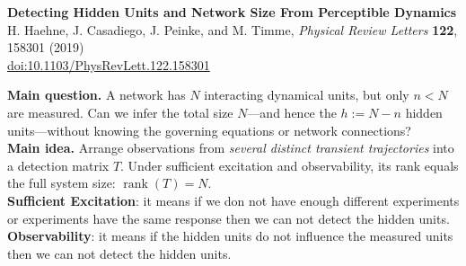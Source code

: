\documentclass[10pt,a4paper]{article}
\begin{document}
\begin{center}
{\Large\bfseries\color{navy} Detecting Hidden Units and Network Size From Perceptible Dynamics}\\[2pt]
{\small H. Haehne, J. Casadiego, J. Peinke, and M. Timme,\quad
\emph{Physical Review Letters} \textbf{122}, 158301 (2019)}\\[-1pt]
{\small \href{https://doi.org/10.1103/PhysRevLett.122.158301}{doi:10.1103/PhysRevLett.122.158301}}
\end{center}
\vspace{-3pt}
\noindent\colorbox{navy!6}{\parbox{\dimexpr\linewidth-2\fboxsep\relax}{\textbf{Main question.}
A network has $N$ interacting dynamical units, but only $n<N$ are measured. Can we infer the total size $N$---and hence the $h:=N-n$ hidden units---without knowing the governing equations or network connections?\\[2pt]
\textbf{Main idea.} Arrange observations from \emph{several distinct transient trajectories} into a detection matrix $T$. Under sufficient excitation and observability, its rank equals the full system size: $\boxed{\operatorname{rank}(T)=N}$.
\\
\textbf{Sufficient Excitation}: it means if we don not have enough different experiments or experiments have the same response then we can not detect the hidden units.
\\
\textbf{Observability}: it means if the hidden units do not influence the measured units then we can not detect the hidden units.
}}
\end{document}
